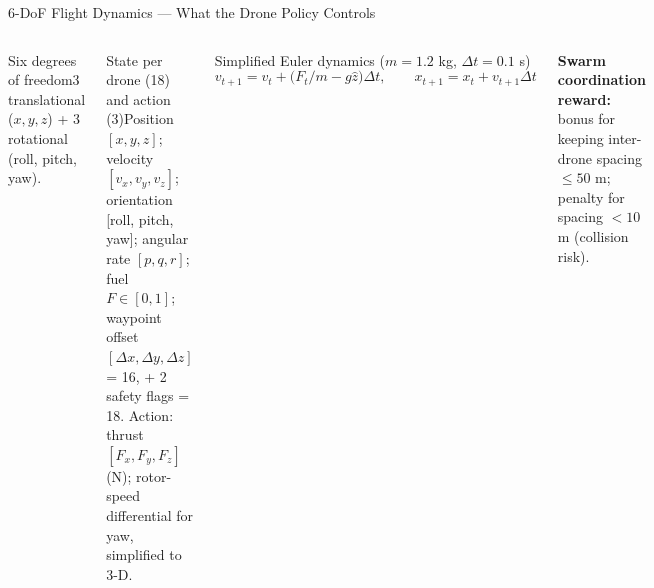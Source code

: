 \documentclass[aspectratio=169,10pt,t]{beamer}
\begin{document}
\begin{frame}{6-DoF Flight Dynamics --- What the Drone Policy Controls}
\begin{columns}[T]
\begin{cbox}[ISSAnavy]{Six degrees of freedom}\scriptsize 3 translational ($x,y,z$) + 3 rotational (roll, pitch, yaw).\end{cbox}
\begin{cbox}{State per drone (18) and action (3)}\scriptsize Position $[x,y,z]$; velocity $[v_x,v_y,v_z]$; orientation [roll, pitch, yaw]; angular rate $[p,q,r]$; fuel $F\in[0,1]$; waypoint offset $[\Delta x,\Delta y,\Delta z]$ = 16, + 2 safety flags = 18. Action: thrust $[F_x,F_y,F_z]$ (N); rotor-speed differential for yaw, simplified to 3-D.\end{cbox}
\begin{fbx}{Simplified Euler dynamics ($m=1.2$ kg, $\Delta t=0.1$ s)}\[v_{t+1}=v_t+\big(F_t/m-g\hat z\big)\Delta t,\qquad x_{t+1}=x_t+v_{t+1}\Delta t\]\end{fbx}
\begin{ibox}\scriptsize\textbf{Swarm coordination reward:} bonus for keeping inter-drone spacing $\le50$ m; penalty for spacing $<10$ m (collision risk).\end{ibox}
\end{columns}
\end{frame}
\end{document}
